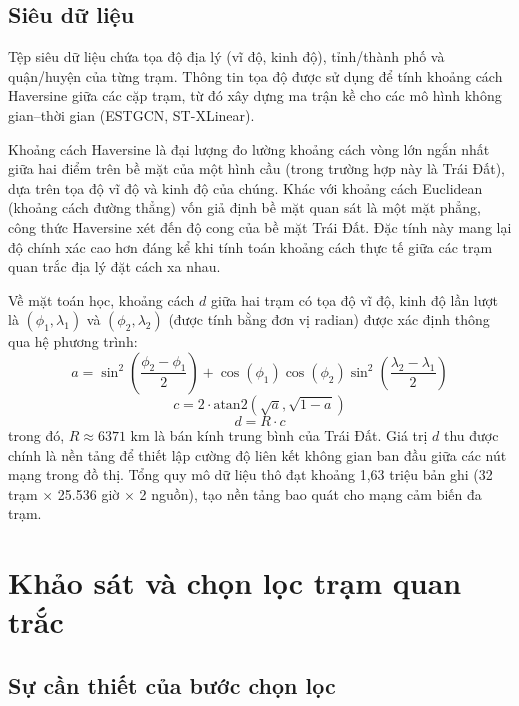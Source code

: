 \subsection{Siêu dữ liệu}

Tệp siêu dữ liệu chứa tọa độ địa lý (vĩ độ, kinh độ), tỉnh/thành phố và quận/huyện của từng trạm. Thông tin tọa độ được sử dụng để tính khoảng cách Haversine giữa các cặp trạm, từ đó xây dựng ma trận kề cho các mô hình không gian--thời gian (ESTGCN, ST-XLinear). 

Khoảng cách Haversine là đại lượng đo lường khoảng cách vòng lớn ngắn nhất giữa hai điểm trên bề mặt của một hình cầu (trong trường hợp này là Trái Đất), dựa trên tọa độ vĩ độ và kinh độ của chúng. Khác với khoảng cách Euclidean (khoảng cách đường thẳng) vốn giả định bề mặt quan sát là một mặt phẳng, công thức Haversine xét đến độ cong của bề mặt Trái Đất. Đặc tính này mang lại độ chính xác cao hơn đáng kể khi tính toán khoảng cách thực tế giữa các trạm quan trắc địa lý đặt cách xa nhau.

Về mặt toán học, khoảng cách $d$ giữa hai trạm có tọa độ vĩ độ, kinh độ lần lượt là $(\phi_1, \lambda_1)$ và $(\phi_2, \lambda_2)$ (được tính bằng đơn vị radian) được xác định thông qua hệ phương trình:
\begin{equation}
    a = \sin^2\left(\frac{\phi_2 - \phi_1}{2}\right) + \cos(\phi_1)\cos(\phi_2)\sin^2\left(\frac{\lambda_2 - \lambda_1}{2}\right)
\end{equation}
\begin{equation}
    c = 2 \cdot \text{atan2}\left(\sqrt{a}, \sqrt{1-a}\right)
\end{equation}
\begin{equation}
    d = R \cdot c
\end{equation}
trong đó, $R \approx 6371 \text{ km}$ là bán kính trung bình của Trái Đất. Giá trị $d$ thu được chính là nền tảng để thiết lập cường độ liên kết không gian ban đầu giữa các nút mạng trong đồ thị. Tổng quy mô dữ liệu thô đạt khoảng 1,63 triệu bản ghi (32 trạm $\times$ 25.536 giờ $\times$ 2 nguồn), tạo nền tảng bao quát cho mạng cảm biến đa trạm.\section{Khảo sát và chọn lọc trạm quan trắc}

\subsection{Sự cần thiết của bước chọn lọc}

